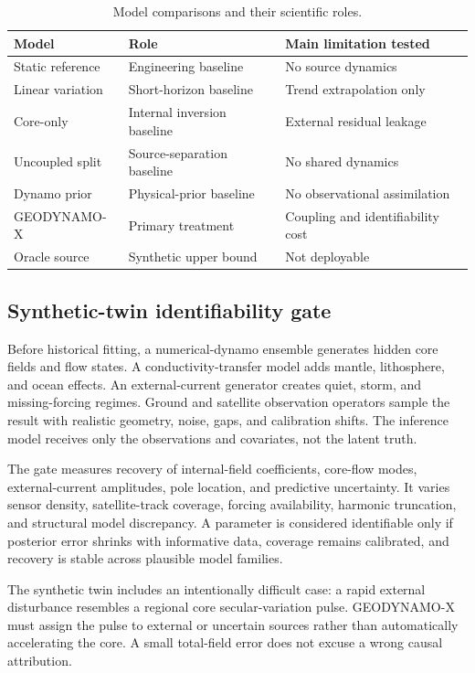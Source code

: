 \documentclass[conference]{IEEEtran}
\begin{document}
\begin{table}[t]
\centering
\caption{Model comparisons and their scientific roles.}
\label{tab:baselines}
\footnotesize
\begin{tabular}{P{1.95cm}P{1.95cm}P{2.15cm}}
\toprule
Model & Role & Main limitation tested \\
\midrule
Static reference & Engineering baseline & No source dynamics \\
Linear variation & Short-horizon baseline & Trend extrapolation only \\
Core-only & Internal inversion baseline & External residual leakage \\
Uncoupled split & Source-separation baseline & No shared dynamics \\
Dynamo prior & Physical-prior baseline & No observational assimilation \\
GEODYNAMO-X & Primary treatment & Coupling and identifiability cost \\
Oracle source & Synthetic upper bound & Not deployable \\
\bottomrule
\end{tabular}
\end{table}

\subsection{Synthetic-twin identifiability gate}
Before historical fitting, a numerical-dynamo ensemble generates hidden core fields and flow states. A conductivity-transfer model adds mantle, lithosphere, and ocean effects. An external-current generator creates quiet, storm, and missing-forcing regimes. Ground and satellite observation operators sample the result with realistic geometry, noise, gaps, and calibration shifts. The inference model receives only the observations and covariates, not the latent truth.

The gate measures recovery of internal-field coefficients, core-flow modes, external-current amplitudes, pole location, and predictive uncertainty. It varies sensor density, satellite-track coverage, forcing availability, harmonic truncation, and structural model discrepancy. A parameter is considered identifiable only if posterior error shrinks with informative data, coverage remains calibrated, and recovery is stable across plausible model families.

The synthetic twin includes an intentionally difficult case: a rapid external disturbance resembles a regional core secular-variation pulse. GEODYNAMO-X must assign the pulse to external or uncertain sources rather than automatically accelerating the core. A small total-field error does not excuse a wrong causal attribution.
\end{document}
